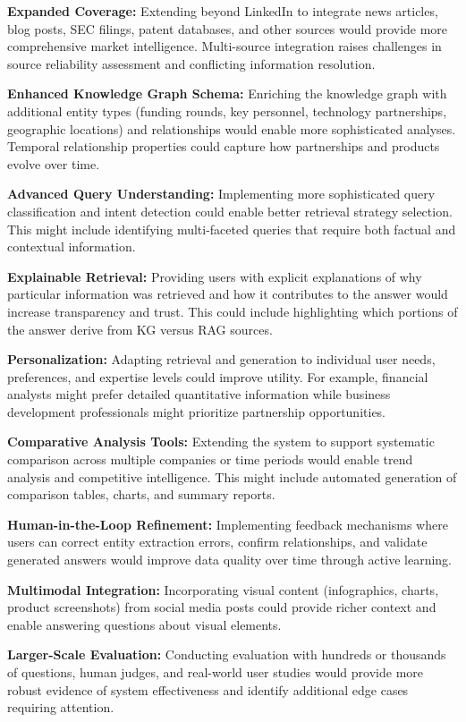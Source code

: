 \documentclass[11pt,twocolumn]{article}
\begin{document}
\textbf{Expanded Coverage:} Extending beyond LinkedIn to integrate news articles, blog posts, SEC filings, patent databases, and other sources would provide more comprehensive market intelligence. Multi-source integration raises challenges in source reliability assessment and conflicting information resolution.

\textbf{Enhanced Knowledge Graph Schema:} Enriching the knowledge graph with additional entity types (funding rounds, key personnel, technology partnerships, geographic locations) and relationships would enable more sophisticated analyses. Temporal relationship properties could capture how partnerships and products evolve over time.

\textbf{Advanced Query Understanding:} Implementing more sophisticated query classification and intent detection could enable better retrieval strategy selection. This might include identifying multi-faceted queries that require both factual and contextual information.

\textbf{Explainable Retrieval:} Providing users with explicit explanations of why particular information was retrieved and how it contributes to the answer would increase transparency and trust. This could include highlighting which portions of the answer derive from KG versus RAG sources.

\textbf{Personalization:} Adapting retrieval and generation to individual user needs, preferences, and expertise levels could improve utility. For example, financial analysts might prefer detailed quantitative information while business development professionals might prioritize partnership opportunities.

\textbf{Comparative Analysis Tools:} Extending the system to support systematic comparison across multiple companies or time periods would enable trend analysis and competitive intelligence. This might include automated generation of comparison tables, charts, and summary reports.

\textbf{Human-in-the-Loop Refinement:} Implementing feedback mechanisms where users can correct entity extraction errors, confirm relationships, and validate generated answers would improve data quality over time through active learning.

\textbf{Multimodal Integration:} Incorporating visual content (infographics, charts, product screenshots) from social media posts could provide richer context and enable answering questions about visual elements.

\textbf{Larger-Scale Evaluation:} Conducting evaluation with hundreds or thousands of questions, human judges, and real-world user studies would provide more robust evidence of system effectiveness and identify additional edge cases requiring attention.
\end{document}
